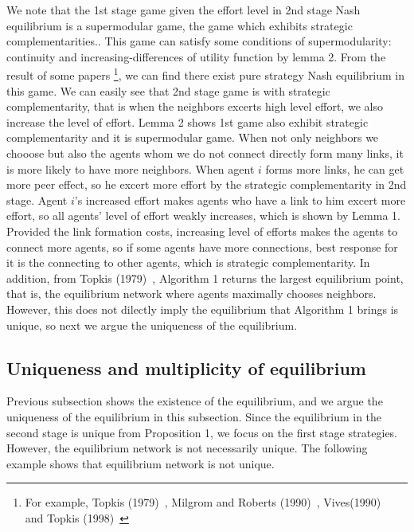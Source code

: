 \documentclass[12pt]{article}
\theoremstyle{definition}
\begin{document}
We note that the 1st stage game given the effort level in 2nd stage Nash equilibrium is a supermodular game, the game which exhibits strategic complementarities..
This game can satisfy some conditions of supermodularity: continuity and increasing-differences of utility function by lemma 2.
From the result of some papers \footnote{For example, Topkis (1979)~\cite{topkis1979}, Milgrom and Roberts (1990)~\cite{milgromroberts}, Vives(1990)~\cite{vives} and Topkis (1998)~\cite{topkis1998}}, we can find there exist pure strategy Nash equilibrium in this game.
We can easily see that 2nd stage game is with strategic complementarity, that is when the neighbors excerts high level effort, we also increase the level of effort.
Lemma 2 shows 1st game also exhibit strategic complementarity and it is supermodular game.
When not only neighbors we chooose but also the agents whom we do not connect directly form many links, it is more likely to have more neighbors.
When agent $i$ forms more links, he can get more peer effect, so he excert more effort by the strategic complementarity in 2nd stage.
Agent $i$'s increased effort makes agents who have a link to him excert more effort, so all agents' level of effort weakly increases, which is shown by Lemma 1.
Provided the link formation costs, increasing level of efforts makes the agents to connect more agents, so if some agents have more connections, best response for it is the connecting to other agents, which is strategic complementarity.
In addition, from Topkis (1979)~\cite{topkis1979}, Algorithm 1 returns the largest equilibrium point, that is, the equilibrium network where agents maximally chooses neighbors.
However, this does not dilectly imply the equilibrium that Algorithm 1 brings is unique, so next we argue the uniqueness of the equilibrium.


\subsection{Uniqueness and multiplicity of equilibrium}

Previous subsection shows the existence of the equilibrium, and we argue the uniqueness of the equilibrium in this subsection.
Since the equilibrium in the second stage is unique from Proposition 1, we focus on the first stage strategies.
However, the equilibrium network is not necessarily unique.
The following example shows that equilibrium network is not unique.
\end{document}
